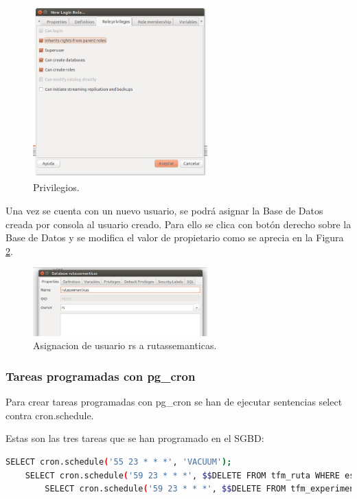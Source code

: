\begin{figure}[h]
  \centering
    \includegraphics[width=0.6\textwidth]{../img/instalacion/nr3.jpg}
  \caption{Privilegios.}
  \label{nr3}
\end{figure}

Una vez se cuenta con un nuevo usuario, se podrá asignar la Base de Datos creada por consola al usuario creado. Para ello se clica con botón derecho sobre la Base de Datos y se modifica el valor de propietario como se aprecia en la Figura \ref{asignacion}.

\begin{figure}[h]
  \centering
    \includegraphics[width=0.6\textwidth]{../img/instalacion/asignacion.jpg}
  \caption{Asignacion de usuario rs a rutassemanticas.}
  \label{asignacion}
\end{figure}

\subsubsection{Tareas programadas con pg\_cron}
Para crear tareas programadas con pg\_cron se han de ejecutar sentencias select contra cron.schedule.

Estas son las tres tareas que se han programado en el SGBD:

\begin{lstlisting}[language=bash]
	SELECT cron.schedule('55 23 * * *', 'VACUUM');
	SELECT cron.schedule('59 23 * * *', $$DELETE FROM tfm_ruta WHERE es_temporal = true$$);
		SELECT cron.schedule('59 23 * * *', $$DELETE FROM tfm_experimento WHERE es_temporal = true$$);
\end{lstlisting}

